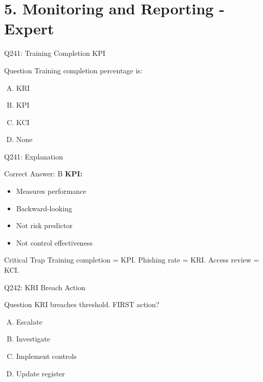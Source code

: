 \documentclass{beamer}
\begin{document}
	\section{5. Monitoring and Reporting - Expert}
	
	\begin{frame}{Q241: Training Completion KPI}
		\begin{block}{Question}
			Training completion percentage is:
		\end{block}
		\begin{enumerate}[(A)]
			\item KRI
			\item KPI
			\item KCI
			\item None
		\end{enumerate}
	\end{frame}
	
	\begin{frame}{Q241: Explanation}
		\begin{block}{Correct Answer: B}
			\textbf{KPI:}
			\begin{itemize}
				\item Measures performance
				\item Backward-looking
				\item Not risk predictor
				\item Not control effectiveness
			\end{itemize}
		\end{block}
		\begin{alertblock}{Critical Trap}
			Training completion = KPI.
			Phishing rate = KRI.
			Access review = KCI.
		\end{alertblock}
	\end{frame}
	
	\begin{frame}{Q242: KRI Breach Action}
		\begin{block}{Question}
			KRI breaches threshold. FIRST action?
		\end{block}
		\begin{enumerate}[(A)]
			\item Escalate
			\item Investigate
			\item Implement controls
			\item Update register
		\end{enumerate}
	\end{frame}
	
\end{document}
